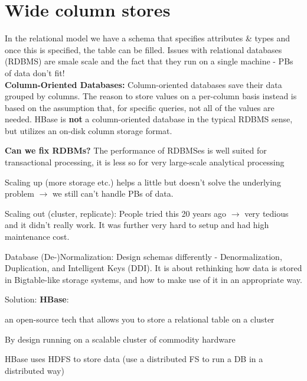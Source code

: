 \documentclass[11pt,oneside,a4paper]{article}
\begin{document}
\newpage

\section{Wide column stores}

In the relational model we have a schema that specifies attributes \& types and once this is specified, the table can be filled. Issues with relational databases (RDBMS) are smale scale and the fact that they run on a single machine - PBs of data don't fit!\\
\textbf{Column-Oriented Databases:} Column-oriented databases save their data grouped by columns. The reason to store values on a per-column basis instead is based on the assumption that, for specific queries, not all of the values are needed. HBase is \textbf{not} a column-oriented database in the typical RDBMS sense, but utilizes an on-disk column storage format.


\textbf{Can we fix RDBMs?}
The performance of RDBMSes is well suited for transactional processing, it is less so for very large-scale analytical processing

\begin{compactitem}
	\item Scaling up (more storage etc.) helps a little but doesn't solve the underlying problem $\rightarrow$ we still can't handle PBs of data.
	\item Scaling out (cluster, replicate): People tried this 20 years ago $\rightarrow$ very tedious and it didn't really work. It was further very hard to setup and had high maintenance cost.
\end{compactitem}

Database (De-)Normalization: Design schemas differently - Denormalization, Duplication, and Intelligent Keys (DDI). It is about rethinking how data is stored in Bigtable-like storage systems, and how to make use of it in an appropriate way.

Solution: \textbf{HBase}:

\begin{compactitem}
	\item an open-source tech that allows you to store a relational table on a cluster
	\item By design running on a scalable cluster of commodity hardware
	\item HBase uses HDFS to store data (use a distributed FS to run a DB in a distributed way)
\end{compactitem}
\end{document}
